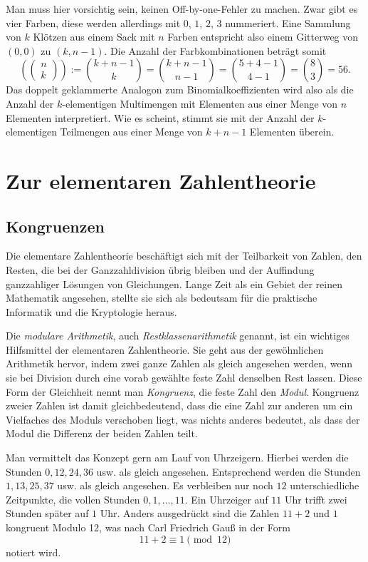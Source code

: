 Man muss hier vorsichtig sein, keinen Off-by-one-Fehler zu machen.
Zwar gibt es vier Farben, diese werden allerdings mit $0$, $1$, $2$, $3$
nummeriert. Eine Sammlung von $k$ Klötzen aus einem Sack mit $n$ Farben
entspricht also einem Gitterweg von $(0,0)$ zu $(k,n-1)$. Die Anzahl
der Farbkombinationen beträgt somit
\[\left(\!\left(\begin{matrix}n\\ k\end{matrix}\right)\!\right) :=
\binom{k+n-1}{k} = \binom{k+n-1}{n-1} = \binom{5+4-1}{4-1} = \binom{8}{3} = 56.\]
Das doppelt geklammerte Analogon zum Binomialkoeffizienten wird also als
die Anzahl der $k$-elementigen Multimengen mit Elementen aus einer Menge
von $n$ Elementen interpretiert. Wie es scheint, stimmt sie mit der Anzahl
der $k$-elementigen Teilmengen aus einer Menge von $k+n-1$ Elementen
überein.

\section{Zur elementaren Zahlentheorie}

\subsection{Kongruenzen}

Die elementare Zahlentheorie beschäftigt sich mit der Teilbarkeit von
Zahlen, den Resten, die bei der Ganzzahldivision übrig bleiben
und der Auffindung ganzzahliger Lösungen von Gleichungen. Lange Zeit
als ein Gebiet der reinen Mathematik angesehen, stellte sie sich
als bedeutsam für die praktische Informatik und die Kryptologie heraus. 

Die \emph{modulare Arithmetik}, auch \emph{Restklassenarithmetik}
genannt, ist ein wichtiges Hilfsmittel der elementaren Zahlentheorie.
Sie geht aus der gewöhnlichen Arithmetik hervor, indem zwei ganze
Zahlen als gleich angesehen werden, wenn sie bei Division durch eine
vorab gewählte feste Zahl denselben Rest lassen. Diese Form der
Gleichheit nennt man \emph{Kongruenz}, die feste Zahl den \emph{Modul}.
Kongruenz zweier Zahlen ist damit gleichbedeutend, dass die eine
Zahl zur anderen um ein Vielfaches des Moduls verschoben liegt, was nichts
anderes bedeutet, als dass der Modul die Differenz der beiden Zahlen teilt.

Man vermittelt das Konzept gern am Lauf von Uhrzeigern. Hierbei werden
die Stunden $0, 12, 24, 36$ usw. als gleich angesehen. Entsprechend
werden die Stunden $1, 13, 25, 37$ usw. als gleich angesehen. Es
verbleiben nur noch $12$ unterschiedliche Zeitpunkte, die vollen
Stunden $0, 1, \ldots, 11$. Ein Uhrzeiger auf $11$ Uhr trifft
zwei Stunden später auf $1$ Uhr. Anders ausgedrückt sind die Zahlen
$11+2$ und $1$ kongruent Modulo 12, was nach Carl Friedrich Gauß
in der Form
\[11 + 2\equiv 1\pmod{12}\]
notiert wird.

